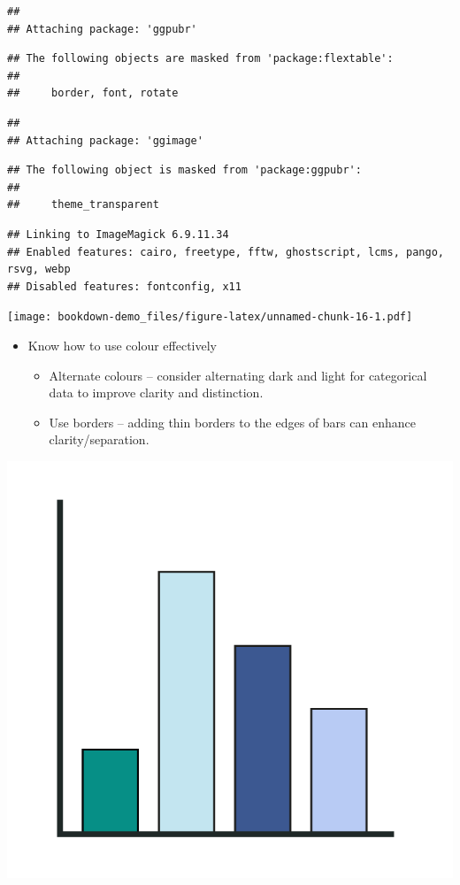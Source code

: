\documentclass[
]{book}
\providecommand{\tightlist}{%
  \setlength{\itemsep}{0pt}\setlength{\parskip}{0pt}}
\begin{document}
\begin{verbatim}
## 
## Attaching package: 'ggpubr'
\end{verbatim}

\begin{verbatim}
## The following objects are masked from 'package:flextable':
## 
##     border, font, rotate
\end{verbatim}

\begin{verbatim}
## 
## Attaching package: 'ggimage'
\end{verbatim}

\begin{verbatim}
## The following object is masked from 'package:ggpubr':
## 
##     theme_transparent
\end{verbatim}

\begin{verbatim}
## Linking to ImageMagick 6.9.11.34
## Enabled features: cairo, freetype, fftw, ghostscript, lcms, pango, rsvg, webp
## Disabled features: fontconfig, x11
\end{verbatim}

\texttt{[image: bookdown-demo\_files/figure-latex/unnamed-chunk-16-1.pdf]}

\begin{itemize}
\item
  Know how to use colour effectively

  \begin{itemize}
  \tightlist
  \item
    Alternate colours -- consider alternating dark and light for categorical data to improve clarity and distinction.
  \item
    Use borders -- adding thin borders to the edges of bars can enhance clarity/separation.
  \end{itemize}
\end{itemize}

\includegraphics[width=1\linewidth]{img/visegs/egcolsgoodpractice}
\end{document}
